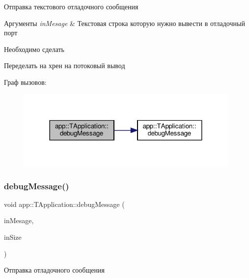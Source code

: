 Отправка текстового отладочного сообщения 


\begin{DoxyParams}{Аргументы}
{\em in\+Mesage} & Текстовая строка которую нужно вывести в отладочный порт \\
\hline
\end{DoxyParams}
\begin{DoxyRefDesc}{Необходимо сделать}
\item[\hyperlink{todo__todo000001}{Необходимо сделать}]Переделать на хрен на потоковый вывод \end{DoxyRefDesc}
Граф вызовов\+:\nopagebreak
\begin{figure}[H]
\begin{center}
\leavevmode
\includegraphics[width=312pt]{classapp_1_1_t_application_abec229b87538c5db318ef57f25f6e84d_cgraph}
\end{center}
\end{figure}
\mbox{\label{classapp_1_1_t_application_ac0c8e394021c1d1ab4163bc8bd8f7b42}} 
\subsubsection{\texorpdfstring{debug\+Message()}{debugMessage()}\hspace{0.1cm}{\footnotesize\ttfamily [2/4]}}
{\footnotesize\ttfamily void app\+::\+T\+Application\+::debug\+Message (\begin{DoxyParamCaption}\item[{const char $\ast$}]{in\+Mesage,  }\item[{const std\+::size\+\_\+t}]{in\+Size }\end{DoxyParamCaption})}



Отправка отладочного сообщения 

